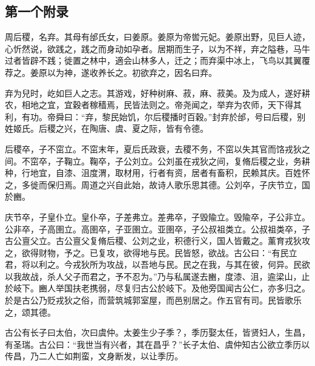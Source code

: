 \documentclass[UTF8,12pt,AutoFakeBold]{ctexart}
\begin{document}
\begin{appendices}
    \setcounter{table}{0}
    \setcounter{figure}{0}
    \setcounter{equation}{0}
    \renewcommand{\thetable}{\thesection-\arabic{table}}
    \renewcommand{\theequation}{\thesection-\arabic{equation}}
    \renewcommand{\thefigure}{\thesection-\arabic{figure}}
    
    
    
    
    \section{第一个附录\label{附录：第一个附录}}
    周后稷，名弃。其母有邰氏女，曰姜原。姜原为帝喾元妃。姜原出野，见巨人迹，心忻然说，欲践之，践之而身动如孕者。居期而生子，以为不祥，弃之隘巷，马牛过者皆辟不践；徙置之林中，適会山林多人，迁之；而弃渠中冰上，飞鸟以其翼覆荐之。姜原以为神，遂收养长之。初欲弃之，因名曰弃。
    
    弃为兒时，屹如巨人之志。其游戏，好种树麻、菽，麻、菽美。及为成人，遂好耕农，相地之宜，宜穀者稼穑焉，民皆法则之。帝尧闻之，举弃为农师，天下得其利，有功。帝舜曰：“弃，黎民始饥，尔后稷播时百穀。”封弃於邰，号曰后稷，别姓姬氏。后稷之兴，在陶唐、虞、夏之际，皆有令德。
    
    后稷卒，子不窋立。不窋末年，夏后氏政衰，去稷不务，不窋以失其官而饹戎狄之间。不窋卒，子鞠立。鞠卒，子公刘立。公刘虽在戎狄之间，复脩后稷之业，务耕种，行地宜，自漆、沮度渭，取材用，行者有资，居者有畜积，民赖其庆。百姓怀之，多徙而保归焉。周道之兴自此始，故诗人歌乐思其德。公刘卒，子庆节立，国於豳。
    
    庆节卒，子皇仆立。皇仆卒，子差弗立。差弗卒，子毁隃立。毁隃卒，子公非立。公非卒，子高圉立。高圉卒，子亚圉立。亚圉卒，子公叔祖类立。公叔祖类卒，子古公亶父立。古公亶父复脩后稷、公刘之业，积德行义，国人皆戴之。薰育戎狄攻之，欲得财物，予之。已复攻，欲得地与民。民皆怒，欲战。古公曰：“有民立君，将以利之。今戎狄所为攻战，以吾地与民。民之在我，与其在彼，何异。民欲以我故战，杀人父子而君之，予不忍为。”乃与私属遂去豳，度漆、沮，逾梁山，止於岐下。豳人举国扶老携弱，尽复归古公於岐下。及他旁国闻古公仁，亦多归之。於是古公乃贬戎狄之俗，而营筑城郭室屋，而邑别居之。作五官有司。民皆歌乐之，颂其德。
    
    古公有长子曰太伯，次曰虞仲。太姜生少子季？，季历娶太任，皆贤妇人，生昌，有圣瑞。古公曰：“我世当有兴者，其在昌乎？”长子太伯、虞仲知古公欲立季历以传昌，乃二人亡如荆蛮，文身断发，以让季历。
    

\end{appendices}
\end{document}
